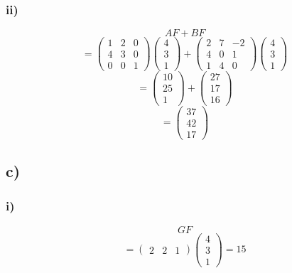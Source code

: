         \subsubsection{ii)}
            $$AF+BF$$
            $$= \begin{pmatrix}
                1 & 2 & 0\\
                4 & 3 & 0\\
                0 & 0 & 1
            \end{pmatrix}
            \begin{pmatrix}
                4\\
                3\\
                1
            \end{pmatrix}
            +
            \begin{pmatrix}
                2 & 7 & -2 \\
                4 & 0 & 1 \\
                1 & 4 & 0
            \end{pmatrix}
            \begin{pmatrix}
                4\\
                3\\
                1
            \end{pmatrix}
            $$
            $$=
            \begin{pmatrix}
                10\\
                25\\
                1
            \end{pmatrix}
            +
            \begin{pmatrix}
                27\\
                17\\
                16
            \end{pmatrix}
            $$
            $$=
            \begin{pmatrix}
                37\\
                42\\
                17
            \end{pmatrix}$$

    \subsection{c)}
        \subsubsection{i)}
            $$GF$$
            $$=\begin{pmatrix}
                2 & 2 & 1
            \end{pmatrix}
            \begin{pmatrix}
                4 \\
                3 \\
                1
            \end{pmatrix}=15$$
            
